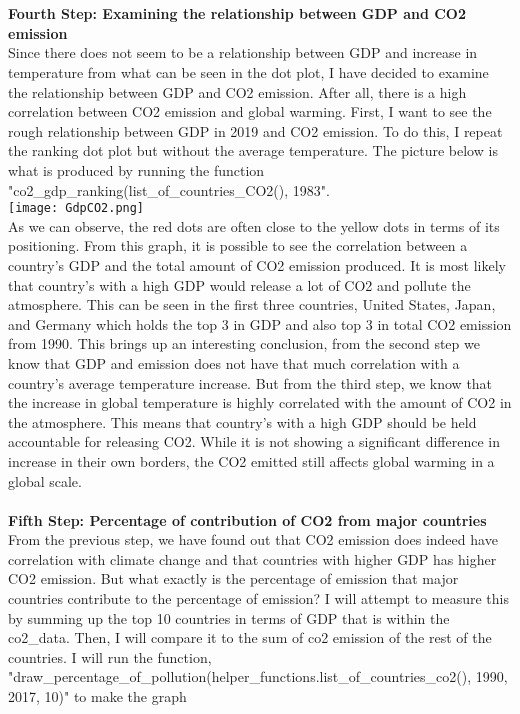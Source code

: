 \documentclass[fontsize=11pt]{article}
\begin{document}
\\\\
\textbf{Fourth Step: Examining the relationship between GDP and CO2 emission}
\\
Since there does not seem to be a relationship between GDP and increase in temperature from what can be seen in the dot plot, I have decided to examine the relationship between GDP and CO2 emission. After all, there is a high correlation between CO2 emission and global warming. First, I want to see the rough relationship between GDP in 2019 and CO2 emission. To do this, I repeat the ranking dot plot but without the average temperature.
The picture below is what is produced by running the function "co2\_gdp\_ranking(list\_of\_countries\_CO2(), 1983".
\\
\texttt{[image: GdpCO2.png]}
\\
As we can observe, the red dots are often close to the yellow dots in terms of its positioning. From this graph, it is possible to see the correlation between a country's GDP and the total amount of CO2 emission produced. It is most likely that country's with a high GDP would release a lot of CO2 and pollute the atmosphere. This can be seen in the first three countries, United States, Japan, and Germany which holds the top 3 in GDP and also top 3 in total CO2 emission from 1990. This brings up an interesting conclusion, from the second step we know that GDP and emission does not have that much correlation with a country's average temperature increase. But from the third step, we know that the increase in global temperature is highly correlated with the amount of CO2 in the atmosphere. This means that country's with a high GDP should be held accountable for releasing CO2. While it is not showing a significant difference in increase in their own borders, the CO2 emitted still affects global warming in a global scale.
\\\\
\textbf{Fifth Step: Percentage of contribution of CO2 from major countries}
\\
From the previous step, we have found out that CO2 emission does indeed have correlation with climate change and that countries with higher GDP has higher CO2 emission. But what exactly is the percentage of emission that major countries contribute to the percentage of emission? I will attempt to measure this by summing up the top 10 countries in terms of GDP that is within the co2\_data. Then, I will compare it to the sum of co2 emission of the rest of the countries. I will run the function, "draw\_percentage\_of\_pollution(helper\_functions.list\_of\_countries\_co2(), 1990, 2017, 10)" to make the graph
\end{document}

